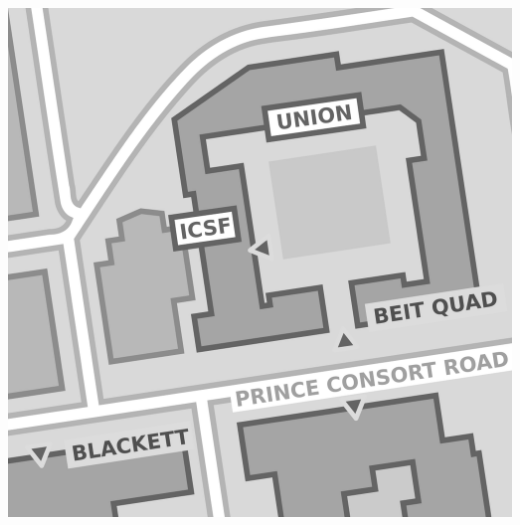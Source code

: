 \thispagestyle{empty}
\vspace*{\fill}

\hspace{\fill}%
\begin{minipage}{\textwidth}
\includegraphics[width=\textwidth]{img/info/map.png}

\vspace{2em}


\end{minipage}
